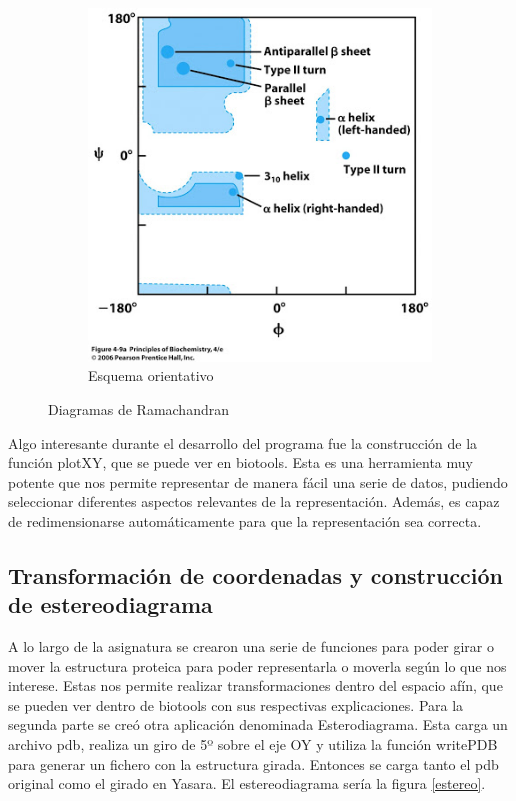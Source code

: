 \documentclass[a4paper,11pt]{report}
\begin{document}
\begin{figure}[h!]
	\begin{subfigure}{0.45\textwidth}
		\includegraphics[width=\linewidth]{Figuras/Figura17}
		\caption{Esquema orientativo}
	\end{subfigure}

\caption{Diagramas de Ramachandran}
\label{fig: rama}	
\end{figure}



Algo interesante durante el desarrollo del programa fue la construcción de la función plotXY, que se puede ver en biotools. Esta es una herramienta muy potente que nos permite representar de manera fácil una serie de datos, pudiendo seleccionar diferentes aspectos relevantes de la representación. Además, es capaz de redimensionarse automáticamente para que la representación sea correcta.
 \subsection{Transformación de coordenadas y construcción de estereodiagrama}
 A lo largo de la asignatura se crearon una serie de funciones para poder girar o mover la estructura proteica para poder representarla o moverla según lo que nos interese.  Estas nos permite realizar transformaciones dentro del espacio afín, que se pueden ver dentro de biotools con sus respectivas explicaciones.
 Para la segunda parte se creó otra aplicación denominada Esterodiagrama. Esta carga un archivo pdb, realiza un giro de 5º sobre el eje OY y utiliza la función writePDB para generar un fichero con la estructura girada. Entonces se carga tanto el pdb original como el girado en Yasara. El estereodiagrama sería la figura \ref{estereo}.
 
\end{document}
